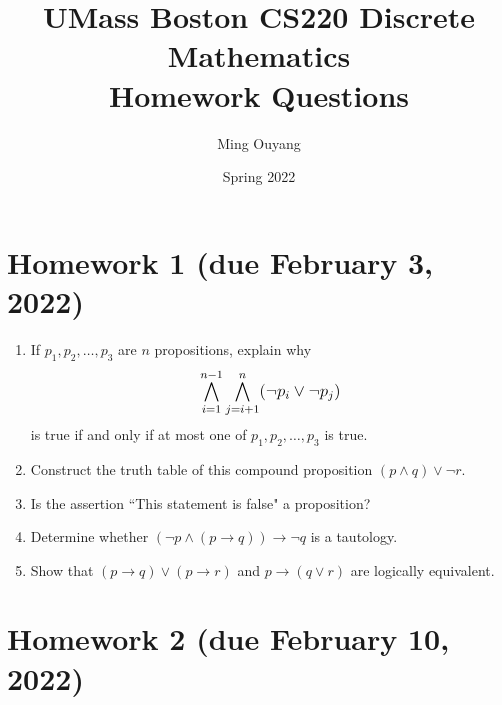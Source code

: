 \documentclass[letterpaper, 12pt]{article}
\title{UMass Boston CS220 Discrete Mathematics\protect\\Homework Questions}
\author{Ming Ouyang}
\date{Spring 2022}
\begin{document}
\maketitle
\thispagestyle{fancy}
\section*{Homework 1 (due February 3, 2022)}

\begin{enumerate}
    \item If $p_1, p_2, \ldots, p_3$ are $n$ propositions, explain why
    \[\mathlarger{\bigwedge_{i=1}^{n-1} \bigwedge_{j=i+1}^n (\neg p_i \vee \neg p_j)}\]
    is true if and only if at most one of $p_1, p_2, \ldots, p_3$ is true.
    \item Construct the truth table of this compound proposition $(p \wedge q) \vee \neg r$.
    \item Is the assertion ``This statement is false" a proposition?
    \item Determine whether $(\neg p \wedge (p \to q)) \to \neg q$ is a tautology.
    \item Show that $(p \to q) \vee (p \to r)$ and $p \to (q \vee r)$ are logically equivalent.
\end{enumerate}

\section*{Homework 2 (due February 10, 2022)}
\end{document}
